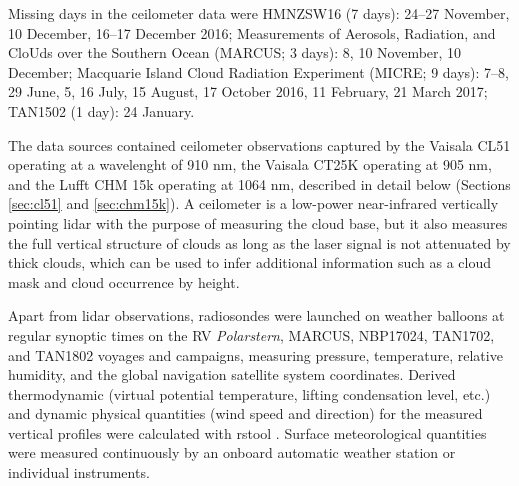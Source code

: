 \documentclass[12pt,a4paper]{article}
\begin{document}
Missing days in the ceilometer data were HMNZSW16 (7 days): 24--27 November, 10
December, 16--17 December 2016; Measurements of Aerosols, Radiation, and CloUds
over the Southern Ocean (MARCUS;  3 days): 8, 10 November, 10 December;
Macquarie Island Cloud Radiation Experiment (MICRE; 9 days): 7--8, 29 June, 5,
16 July, 15 August, 17 October 2016, 11 February, 21 March 2017; TAN1502 (1
day): 24 January.

The data sources contained ceilometer observations captured by the Vaisala CL51
operating at a wavelenght of 910 nm, the Vaisala CT25K operating at 905 nm, and
the Lufft CHM 15k operating at 1064 nm, described in detail below (Sections
\ref{sec:cl51} and \ref{sec:chm15k}). A ceilometer is a low-power near-infrared
vertically pointing lidar with the purpose of measuring the cloud base, but it
also measures the full vertical structure of clouds as long as the laser signal
is not attenuated by thick clouds, which can be used to infer additional
information such as a cloud mask and cloud occurrence by height.

Apart from lidar observations, radiosondes were launched on weather balloons at
regular synoptic times on the RV \emph{Polarstern}, MARCUS, NBP17024, TAN1702,
and TAN1802 voyages and campaigns, measuring pressure, temperature, relative
humidity, and the global navigation satellite system coordinates. Derived
thermodynamic (virtual potential temperature, lifting condensation level, etc.)
and dynamic physical quantities (wind speed and direction) for the measured
vertical profiles were calculated with rstool \citep{rstool}. Surface
meteorological quantities were measured continuously by an onboard automatic
weather station or individual instruments.
\end{document}
